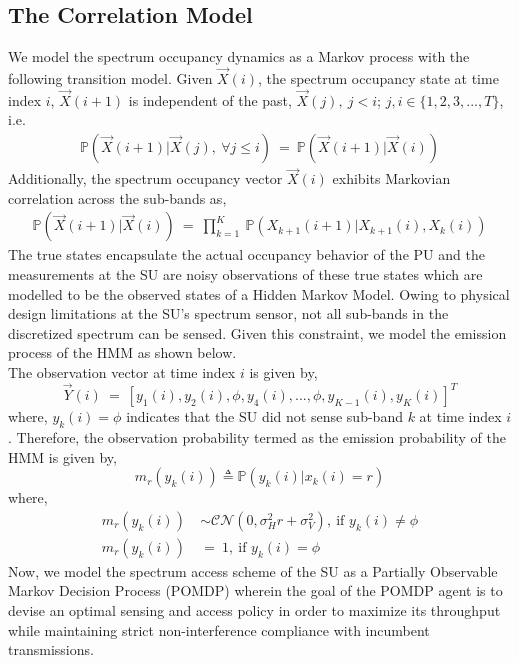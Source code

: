 \documentclass[conference]{IEEEtran}
\begin{document}
\subsection{The Correlation Model}
We model the spectrum occupancy dynamics as a Markov process with the following transition model. Given $\vec{X}(i)$, the spectrum occupancy state at time index $i$, $\vec{X}(i+1)$ is independent of the past, $\vec{X}(j),\ j < i$; $j, i \in \{1,2,3,...,T\}$, i.e.
\begin{equation}\label{4}
    \begin{aligned}
        \mathbb{P}(\vec{X}(i+1)|\vec{X}(j),\ \forall j \leq i)\ =\ \mathbb{P}(\vec{X}(i+1)|\vec{X}(i))
    \end{aligned}
\end{equation}
Additionally, the spectrum occupancy vector $\vec{X}(i)$ exhibits Markovian correlation across the sub-bands as,
\begin{equation}\label{5}
    \begin{aligned}
         \mathbb{P}(\vec{X}(i+1)|\vec{X}(i))\ =\ 
         \prod_{k=1}^K\ \mathbb{P}(X_{k+1}(i+1)|X_{k+1}(i),X_{k}(i))
    \end{aligned}
\end{equation}
The true states encapsulate the actual occupancy behavior of the PU and the measurements at the SU are noisy observations of these true states which are modelled to be the observed states of a Hidden Markov Model. Owing to physical design limitations at the SU's spectrum sensor, not all sub-bands in the discretized spectrum can be sensed. Given this constraint, we model the emission process of the HMM as shown below.
\\The observation vector at time index $i$ is given by,
\begin{equation}\label{6}
    \vec{Y}(i)\ =\ [y_1(i),y_2(i),\phi,y_4(i),...,\phi,y_{K-1}(i),y_K(i)]^T
\end{equation}
where, $y_k(i) = \phi$ indicates that the SU did not sense sub-band $k$ at time index $i$. Therefore, the observation probability termed as the emission probability of the HMM is given by,
\begin{equation*}
    m_r(y_k(i)) \triangleq \mathbb{P}(y_k(i)|x_k(i)=r)
\end{equation*}
where,
\begin{equation}\label{7}
    \begin{aligned}
        m_r(y_k(i))\ &\sim \mathcal{CN}(0,\sigma_H^2r+\sigma_V^2),\ \text{if $y_k(i) \not = \phi$} \\
        m_r(y_k(i))\ &=\ 1,\ \text{if $y_k(i) = \phi$}
    \end{aligned}
\end{equation}
Now, we model the spectrum access scheme of the SU as a Partially Observable Markov Decision Process (POMDP) wherein the goal of the POMDP agent is to devise an optimal sensing and access policy in order to maximize its throughput while maintaining strict non-interference compliance with incumbent transmissions.
\end{document}
